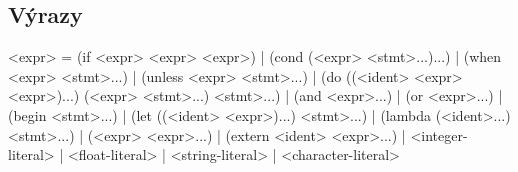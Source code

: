 \subsection{Výrazy}

\begin{gram}
<expr>        = (if <expr> <expr> <expr>)
              | (cond (<expr> <stmt>...)...)
              | (when <expr> <stmt>...)
              | (unless <expr> <stmt>...)
              | (do ((<ident> <expr> <expr>)...) (<expr> <stmt>...) <stmt>...)
              | (and <expr>...)
              | (or <expr>...)
              | (begin <stmt>...)
              | (let ((<ident> <expr>)...) <stmt>...)
              | (lambda (<ident>...) <stmt>...)
              | (<expr> <expr>...)
              | (extern <ident> <expr>...)
              | <integer-literal>
              | <float-literal>
              | <string-literal>
              | <character-literal>
\end{gram}

